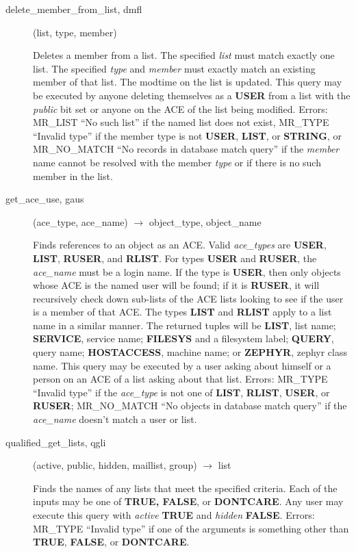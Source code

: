 \documentclass{article}
\begin{document}
\begin{description}
\item[delete\_member\_from\_list, dmfl](list, type, member)

Deletes a member from a list.  The specified {\em list} must match exactly
one list.  The specified {\em type} and {\em member} must exactly match an
existing member of that list.  The modtime on the list is updated.
This query may be executed by anyone deleting themselves as a {\bf USER}
from a list with the {\em public} bit set or anyone on the ACE of the list
being modified.  Errors: MR\_LIST ``No such list'' if the named list
does not exist, MR\_TYPE ``Invalid type'' if the member type is not
{\bf USER}, {\bf LIST}, or {\bf STRING}, or MR\_NO\_MATCH ``No records in database
match query'' if the {\em member} name cannot be resolved with the member
{\em type} or if there is no such member in the list.

\item[get\_ace\_use, gaus](ace\_type, ace\_name) $\rightarrow$ object\_type, object\_name

Finds references to an object as an ACE.  Valid {\em ace\_types} are
{\bf USER}, {\bf LIST}, {\bf RUSER}, and {\bf RLIST}.  For types {\bf USER} and
{\bf RUSER}, the {\em ace\_name} must be a login name.  If the type is
{\bf USER}, then only objects whose ACE is the named user will be found;
if it is {\bf RUSER}, it will recursively check down sub-lists of the
ACE lists looking to see if the user is a member of that ACE.  The
types {\bf LIST} and {\bf RLIST} apply to a list name in a similar manner.
The returned tuples will be {\bf LIST}, list name; {\bf SERVICE}, service
name; {\bf FILESYS} and a filesystem label; {\bf QUERY}, query name;
{\bf HOSTACCESS}, machine name; or {\bf ZEPHYR}, zephyr class name.  This
query may be executed by a user asking about himself or a person on an
ACE of a list asking about that list.  Errors: MR\_TYPE ``Invalid type''
if the {\em ace\_type} is not one of {\bf LIST}, {\bf RLIST}, {\bf USER}, or
{\bf RUSER}; MR\_NO\_MATCH ``No objects in database match query'' if the
{\em ace\_name} doesn't match a user or list.

\item[qualified\_get\_lists, qgli](active, public, hidden, maillist,
group) $\rightarrow$ list

Finds the names of any lists that meet the specified criteria.  Each
of the inputs may be one of {\bf TRUE, FALSE}, or {\bf DONTCARE}.  Any
user may execute this query with {\em active} {\bf TRUE} and {\em hidden}
{\bf FALSE}.  Errors: MR\_TYPE ``Invalid type'' if one of the arguments is
something other than {\bf TRUE}, {\bf FALSE}, or {\bf DONTCARE}.


\end{description}
\end{document}
